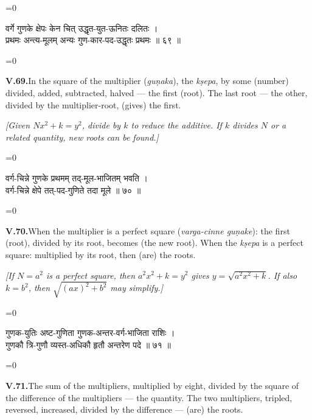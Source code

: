 \documentclass[11pt,a4paper]{article}
\newcommand{\dev}[1]{{\devanagarifont\color{sktcolor}#1}}
\newcommand{\iast}[1]{\textit{#1}}
\newenvironment{paracol}[1]{\begingroup}{\endgroup}
\newcommand{\switchcolumn}[1][]{%
  \ifnum#1=0\relax\else\par\nobreak\vspace{0.5em}\par\nobreak\fi%
}
\begin{document}
\vspace{0.3cm}

\begin{paracol}{2}
\switchcolumn[0]
\dev{%
वर्गे गुणके क्षेपः केन चित् उद्धृत-युत-ऊनितः दलितः ।\\
प्रथमः अन्त्य-मूलम् अन्यः गुण-कार-पद-उद्धृतः प्रथमः ॥ ६९ ॥
}

\switchcolumn[1]
\textbf{V.69.}\quad In the square of the multiplier
(\iast{guṇaka}), the \iast{kṣepa}, by some (number) divided, added,
subtracted, halved — the first (root). The last root — the other,
divided by the multiplier-root, (gives) the first.

\medskip
\textit{[Given $Nx^2 + k = y^2$, divide by $k$ to reduce the
additive. If $k$ divides $N$ or a related quantity, new roots
can be found.]}
\end{paracol}

\vspace{0.3cm}

\begin{paracol}{2}
\switchcolumn[0]
\dev{%
वर्ग-चिन्ने गुणके प्रथमम् तद्-मूल-भाजितम् भवति ।\\
वर्ग-चिन्ने क्षेपे तत्-पद-गुणिते तदा मूले ॥ ७० ॥
}

\switchcolumn[1]
\textbf{V.70.}\quad When the multiplier is a perfect square
(\iast{varga-cinne guṇake}): the first (root), divided by its
root, becomes (the new root). When the \iast{kṣepa} is a perfect
square: multiplied by its root, then (are) the roots.

\medskip
\textit{[If $N = a^2$ is a perfect square, then $a^2x^2 + k = y^2$
gives $y = \sqrt{a^2x^2 + k}$. If also $k = b^2$, then
$\sqrt{(ax)^2 + b^2}$ may simplify.]}
\end{paracol}

\vspace{0.3cm}

\begin{paracol}{2}
\switchcolumn[0]
\dev{%
गुणक-युतिः अष्ट-गुणिता गुणक-अन्तर-वर्ग-भाजिता राशिः ।\\
गुणकौ त्रि-गुणौ व्यस्त-अधिकौ हृतौ अन्तरेण पदे ॥ ७१ ॥
}

\switchcolumn[1]
\textbf{V.71.}\quad The sum of the multipliers, multiplied by eight,
divided by the square of the difference of the multipliers — the
quantity. The two multipliers, tripled, reversed, increased, divided
by the difference — (are) the roots.
\end{paracol}

\vspace{0.3cm}
\end{document}
